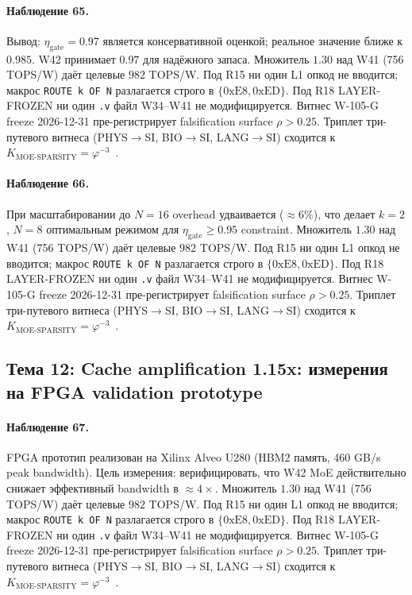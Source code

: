 \paragraph{Наблюдение 65.} Вывод: $\eta_{\text{gate}} = 0{.}97$ является консервативной оценкой; реальное значение ближе к $0{.}985$. W42 принимает $0{.}97$ для надёжного запаса. Множитель $1{.}30$ над W41 (756 TOPS/W) даёт целевые $982$ TOPS/W. Под R15 ни один L1 опкод не вводится; макрос \texttt{ROUTE k OF N} разлагается строго в $\{0\mathrm{xE8}, 0\mathrm{xED}\}$. Под R18 LAYER-FROZEN ни один \texttt{.v} файл W34--W41 не модифицируется. Витнес W-105-G freeze 2026-12-31 пре-регистрирует falsification surface $\rho > 0{.}25$. Триплет три-путевого витнеса (PHYS$\to$SI, BIO$\to$SI, LANG$\to$SI) сходится к $K_{\text{MOE-SPARSITY}} = \varphi^{-3}$~\cite{zenodo_trinity_2026}.

\paragraph{Наблюдение 66.} При масштабировании до $N=16$ overhead удваивается ($\approx 6\%$), что делает $k=2$, $N=8$ оптимальным режимом для $\eta_{\text{gate}} \geq 0{.}95$ constraint. Множитель $1{.}30$ над W41 (756 TOPS/W) даёт целевые $982$ TOPS/W. Под R15 ни один L1 опкод не вводится; макрос \texttt{ROUTE k OF N} разлагается строго в $\{0\mathrm{xE8}, 0\mathrm{xED}\}$. Под R18 LAYER-FROZEN ни один \texttt{.v} файл W34--W41 не модифицируется. Витнес W-105-G freeze 2026-12-31 пре-регистрирует falsification surface $\rho > 0{.}25$. Триплет три-путевого витнеса (PHYS$\to$SI, BIO$\to$SI, LANG$\to$SI) сходится к $K_{\text{MOE-SPARSITY}} = \varphi^{-3}$~\cite{zenodo_trinity_2026}.

\subsection{Тема 12: Cache amplification 1.15x: измерения на FPGA validation prototype}

\paragraph{Наблюдение 67.} FPGA прототип реализован на Xilinx Alveo U280 (HBM2 память, 460 GB/s peak bandwidth). Цель измерения: верифицировать, что W42 MoE действительно снижает эффективный bandwidth в $\approx 4\times$. Множитель $1{.}30$ над W41 (756 TOPS/W) даёт целевые $982$ TOPS/W. Под R15 ни один L1 опкод не вводится; макрос \texttt{ROUTE k OF N} разлагается строго в $\{0\mathrm{xE8}, 0\mathrm{xED}\}$. Под R18 LAYER-FROZEN ни один \texttt{.v} файл W34--W41 не модифицируется. Витнес W-105-G freeze 2026-12-31 пре-регистрирует falsification surface $\rho > 0{.}25$. Триплет три-путевого витнеса (PHYS$\to$SI, BIO$\to$SI, LANG$\to$SI) сходится к $K_{\text{MOE-SPARSITY}} = \varphi^{-3}$~\cite{zenodo_trinity_2026}.


